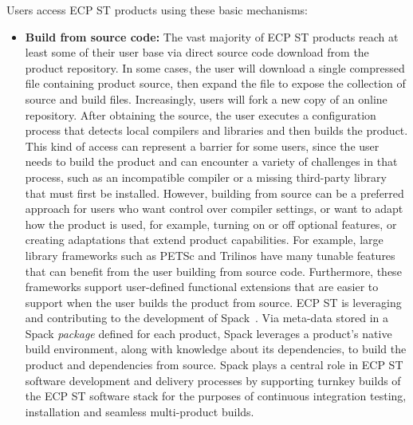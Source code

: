 Users access ECP ST products using these basic mechanisms:
\begin{itemize}
	\item \textbf{Build from source code:} The vast majority of ECP ST products reach at least some of their user base via direct source code download from the product repository.  In some cases, the user will download a single compressed file containing product source, then expand the file to expose the collection of source and build files.  Increasingly, users will fork a new copy of an online repository.  After obtaining the source, the user executes a configuration process that detects local compilers and libraries and then builds the product.  This kind of access can represent a barrier for some users, since the user needs to build the product and can encounter a variety of challenges in that process, such as an incompatible compiler or a missing third-party library that must first be installed.  However, building from source can be a preferred approach for users who want control over compiler settings, or want to adapt how the product is used, for example, turning on or off optional features, or creating adaptations that extend product capabilities.  For example, large library frameworks such as PETSc and Trilinos have many tunable features that can benefit from the user building from source code.  Furthermore, these frameworks support user-defined functional extensions that are easier to support when the user builds the product from source.  ECP ST is leveraging and contributing to the development of Spack~\cite{gamblin+:sc15}.  Via meta-data stored in a Spack \textit{package} defined for each product, Spack leverages a product's native build environment, along with knowledge about its dependencies, to build the product and dependencies from source.  Spack plays a central role in ECP ST software development and delivery processes by supporting turnkey builds of the ECP ST software stack for the purposes of continuous integration testing, installation and seamless multi-product builds.

\end{itemize}
